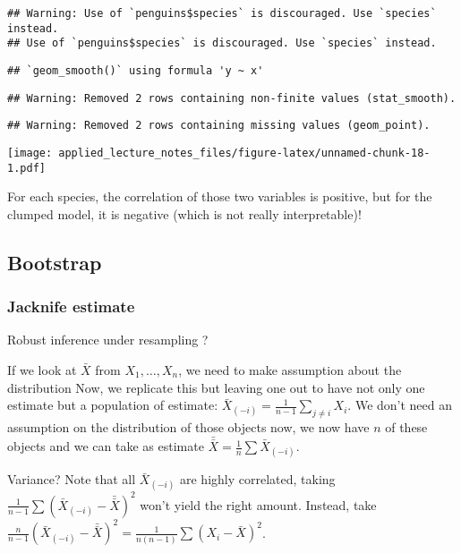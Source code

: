 \documentclass[
]{article}
\begin{document}
\begin{verbatim}
## Warning: Use of `penguins$species` is discouraged. Use `species` instead.
## Use of `penguins$species` is discouraged. Use `species` instead.
\end{verbatim}

\begin{verbatim}
## `geom_smooth()` using formula 'y ~ x'
\end{verbatim}

\begin{verbatim}
## Warning: Removed 2 rows containing non-finite values (stat_smooth).
\end{verbatim}

\begin{verbatim}
## Warning: Removed 2 rows containing missing values (geom_point).
\end{verbatim}

\texttt{[image: applied\_lecture\_notes\_files/figure-latex/unnamed-chunk-18-1.pdf]}

For each species, the correlation of those two variables is positive,
but for the clumped model, it is negative (which is not really
interpretable)!

\hypertarget{bootstrap}{%
\subsection{Bootstrap}\label{bootstrap}}

\hypertarget{jacknife-estimate}{%
\subsubsection{Jacknife estimate}\label{jacknife-estimate}}

Robust inference under resampling ?

If we look at \(\bar{X}\) from \(X_1,\dots, X_n\), we need to make
assumption about the distribution Now, we replicate this but leaving one
out to have not only one estimate but a population of estimate:
\(\bar{X}_{(-i)}=\frac{1}{n-1}\sum_{j\neq i}X_i\). We don't need an
assumption on the distribution of those objects now, we now have \(n\)
of these objects and we can take as estimate
\(\bar{\bar{X}}=\frac{1}{n}\sum\bar{X}_{(-i)}\).

Variance? Note that all \(\bar{X}_{(-i)}\) are highly correlated, taking
\(\frac{1}{n-1}\sum (\bar{X}_{(-i)}-\bar{\bar{X}})^2\) won't yield the
right amount. Instead, take
\(\frac{n}{n-1}(\bar{X}_{(-i)}-\bar{\bar{X}})^2=\frac{1}{n(n-1)}\sum (X_i-\bar{X})^2\).
\end{document}
